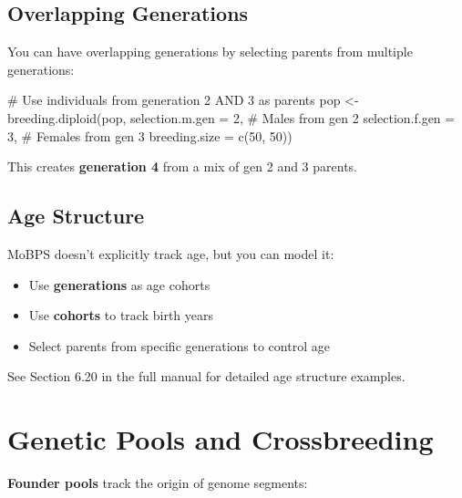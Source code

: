 \documentclass[
  letterpaper,
]{book}
\newenvironment{Shaded}{\begin{snugshade}}{\end{snugshade}}
\newcommand{\AttributeTok}[1]{\textcolor[rgb]{0.40,0.45,0.13}{#1}}
\newcommand{\CommentTok}[1]{\textcolor[rgb]{0.37,0.37,0.37}{#1}}
\newcommand{\DecValTok}[1]{\textcolor[rgb]{0.68,0.00,0.00}{#1}}
\newcommand{\FunctionTok}[1]{\textcolor[rgb]{0.28,0.35,0.67}{#1}}
\newcommand{\NormalTok}[1]{\textcolor[rgb]{0.00,0.23,0.31}{#1}}
\newcommand{\OtherTok}[1]{\textcolor[rgb]{0.00,0.23,0.31}{#1}}
\providecommand{\tightlist}{%
  \setlength{\itemsep}{0pt}\setlength{\parskip}{0pt}}
\begin{document}
\subsection{Overlapping Generations}\label{overlapping-generations}

You can have overlapping generations by selecting parents from multiple
generations:

\begin{Shaded}
\begin{Highlighting}[]
\CommentTok{\# Use individuals from generation 2 AND 3 as parents}
\NormalTok{pop }\OtherTok{\textless{}{-}} \FunctionTok{breeding.diploid}\NormalTok{(pop,}
                        \AttributeTok{selection.m.gen =} \DecValTok{2}\NormalTok{,      }\CommentTok{\# Males from gen 2}
                        \AttributeTok{selection.f.gen =} \DecValTok{3}\NormalTok{,      }\CommentTok{\# Females from gen 3}
                        \AttributeTok{breeding.size =} \FunctionTok{c}\NormalTok{(}\DecValTok{50}\NormalTok{, }\DecValTok{50}\NormalTok{))}
\end{Highlighting}
\end{Shaded}

This creates \textbf{generation 4} from a mix of gen 2 and 3 parents.

\subsection{Age Structure}\label{age-structure}

MoBPS doesn't explicitly track age, but you can model it:

\begin{itemize}
\tightlist
\item
  Use \textbf{generations} as age cohorts
\item
  Use \textbf{cohorts} to track birth years
\item
  Select parents from specific generations to control age
\end{itemize}

See Section 6.20 in the full manual for detailed age structure examples.

\section{Genetic Pools and Crossbreeding}\label{sec-pools}

\textbf{Founder pools} track the origin of genome segments:
\end{document}
